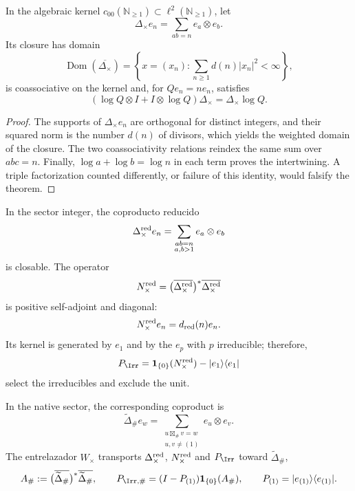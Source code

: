\begin{theorem}
\label{int:pf84:C06}
In the algebraic kernel
\(c_{00}(\mathbb N_{\geq1})\subset\ell^2(\mathbb N_{\geq1})\), let
\[
 \Delta_\times e_n=\sum_{ab=n}e_a\otimes e_b.
\]
Its closure has domain
\[
 \operatorname{Dom}(\overline{\Delta_\times})
 =
 \left\{x=(x_n):
 \sum_{n\geq1}d(n)|x_n|^2<\infty\right\},
\]
is coassociative on the kernel and, for \(Qe_n=ne_n\), satisfies
\[
 (\log Q\otimes I+I\otimes\log Q)\Delta_\times
 =\Delta_\times\log Q.
\]
\end{theorem}

\begin{proof}
The supports of \(\Delta_\times e_n\) are orthogonal for distinct integers,
and their squared norm is the number \(d(n)\) of divisors, which yields the weighted
domain of the closure. The two coassociativity relations reindex the same sum
over \(abc=n\). Finally, \(\log a+\log b=\log n\) in each term
proves the intertwining. A triple factorization counted differently, or failure of
this identity, would falsify the theorem.
\end{proof}

\begin{theorem}
\label{int:pf84:C07}
In the sector integer, the coproducto reducido
\[
 \Delta_\times^{\rm red}e_n
 =\sum_{\substack{ab=n\\a,b>1}}e_a\otimes e_b
\]
is closable. The operator
\[
 N_\times^{\rm red}
 =\bigl(\overline{\Delta_\times^{\rm red}}\bigr)^*
  \overline{\Delta_\times^{\rm red}}
\]
is positive self-adjoint and diagonal:
\[
 N_\times^{\rm red}e_n=d_{\rm red}(n)e_n.
\]
Its kernel is generated by \(e_1\) and by the \(e_p\) with \(p\) irreducible;
therefore,
\[
 P_{\Irr}
 =\mathbf1_{\{0\}}(N_\times^{\rm red})
  -\lvert e_1\rangle\langle e_1\rvert
\]
select the irreducibles and exclude the unit.

In the native sector, the corresponding coproduct is
\[
 \widetilde\Delta_\#e_w
 =\sum_{\substack{u\boxtimes_\#v=w\\u,v\ne(1)}}e_u\otimes e_v.
\]
The entrelazador \(W_\times\) transports
\(\Delta_\times^{\rm red}\), \(N_\times^{\rm red}\) and \(P_{\Irr}\) toward
\(\widetilde\Delta_\#\),
\[
 A_\#:=
 \bigl(\overline{\widetilde\Delta_\#}\bigr)^*
 \overline{\widetilde\Delta_\#},
 \qquad
 P_{\Irr,\#}
 =(I-P_{(1)})\mathbf1_{\{0\}}(A_\#),
 \qquad
 P_{(1)}=\lvert e_{(1)}\rangle\langle e_{(1)}\rvert.
\]
\end{theorem}

